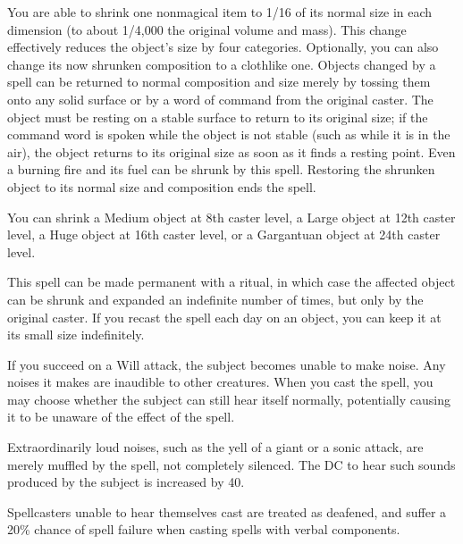 \begin{spelleffect}
  You are able to shrink one nonmagical item to 1/16 of its normal size in each dimension (to about 1/4,000 the original volume and mass). This change effectively reduces the object's size by four categories. Optionally, you can also change its now shrunken composition to a clothlike one. Objects changed by a  spell can be returned to normal composition and size merely by tossing them onto any solid surface or by a word of command from the original caster. The object must be resting on a stable surface to return to its original size; if the command word is spoken while the object is not stable (such as while it is in the air), the object returns to its original size as soon as it finds a resting point. Even a burning fire and its fuel can be shrunk by this spell. Restoring the shrunken object to its normal size and composition ends the spell.
  \par You can shrink a Medium object at 8th caster level, a Large object at 12th caster level, a Huge object at 16th caster level, or a Gargantuan object at 24th caster level.
\end{spelleffect}
\begin{spellnotes}
This spell can be made permanent with a  ritual, in which case the affected object can be shrunk and expanded an indefinite number of times, but only by the original caster. If you recast the spell each day on an object, you can keep it at its small size indefinitely.
\end{spellnotes}

\spellrng{\rngmed}
\begin{spelleffect}
    If you succeed on a Will attack, the subject becomes unable to make noise. Any noises it makes are inaudible to other creatures. When you cast the spell, you may choose whether the subject can still hear itself normally, potentially causing it to be unaware of the effect of the spell.

Extraordinarily loud noises, such as the yell of a giant or a sonic attack, are merely muffled by the spell, not completely silenced. The DC to hear such sounds produced by the subject is increased by 40.
\end{spelleffect}
\begin{spellnotes}
    Spellcasters unable to hear themselves cast are treated as deafened, and suffer a 20\% chance of spell failure when casting spells with verbal components.
\end{spellnotes}

